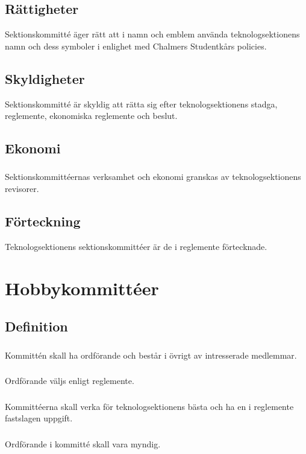 \documentclass[a4paper]{dtek}
\begin{document}
\subsection{Rättigheter}
Sektionskommitté äger rätt att i namn och emblem använda teknologsektionens namn och dess symboler i enlighet med Chalmers Studentkårs policies.
\subsection{Skyldigheter}
Sektionskommitté är skyldig att rätta sig efter teknologsektionens stadga, reglemente, ekonomiska reglemente och beslut.
\subsection{Ekonomi}
\subsubsection{}
Sektionskommittéernas verksamhet och ekonomi granskas av teknologsektionens revisorer.
\subsection{Förteckning}
Teknologsektionens sektionskommittéer är de i reglemente förtecknade.
\newpage

\section{Hobbykommittéer}
\subsection{Definition}
\subsubsection{}
Kommittén skall ha ordförande och består i övrigt av intresserade medlemmar.
\subsubsection{}
Ordförande väljs enligt reglemente.
\subsubsection{}
Kommittéerna skall verka för teknologsektionens bästa och ha en i reglemente fastslagen uppgift.
\subsubsection{}
Ordförande i kommitté skall vara myndig.
\end{document}
